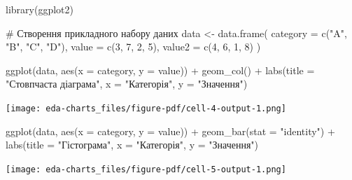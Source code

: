 \documentclass[
  letterpaper,
  DIV=11,
  numbers=noendperiod]{scrreprt}
\newenvironment{Shaded}{\begin{snugshade}}{\end{snugshade}}
\newcommand{\AttributeTok}[1]{\textcolor[rgb]{0.40,0.45,0.13}{#1}}
\newcommand{\CommentTok}[1]{\textcolor[rgb]{0.37,0.37,0.37}{#1}}
\newcommand{\DecValTok}[1]{\textcolor[rgb]{0.68,0.00,0.00}{#1}}
\newcommand{\FunctionTok}[1]{\textcolor[rgb]{0.28,0.35,0.67}{#1}}
\newcommand{\NormalTok}[1]{\textcolor[rgb]{0.00,0.23,0.31}{#1}}
\newcommand{\OtherTok}[1]{\textcolor[rgb]{0.00,0.23,0.31}{#1}}
\newcommand{\SpecialCharTok}[1]{\textcolor[rgb]{0.37,0.37,0.37}{#1}}
\newcommand{\StringTok}[1]{\textcolor[rgb]{0.13,0.47,0.30}{#1}}
\begin{document}
\begin{Shaded}
\begin{Highlighting}[]
\FunctionTok{library}\NormalTok{(ggplot2)}

\CommentTok{\# Створення прикладного набору даних}
\NormalTok{data }\OtherTok{\textless{}{-}} \FunctionTok{data.frame}\NormalTok{(}
  \AttributeTok{category =} \FunctionTok{c}\NormalTok{(}\StringTok{"A"}\NormalTok{, }\StringTok{"B"}\NormalTok{, }\StringTok{"C"}\NormalTok{, }\StringTok{"D"}\NormalTok{),}
  \AttributeTok{value =} \FunctionTok{c}\NormalTok{(}\DecValTok{3}\NormalTok{, }\DecValTok{7}\NormalTok{, }\DecValTok{2}\NormalTok{, }\DecValTok{5}\NormalTok{),}
  \AttributeTok{value2 =} \FunctionTok{c}\NormalTok{(}\DecValTok{4}\NormalTok{, }\DecValTok{6}\NormalTok{, }\DecValTok{1}\NormalTok{, }\DecValTok{8}\NormalTok{)}
\NormalTok{)}
\end{Highlighting}
\end{Shaded}

\begin{Shaded}
\begin{Highlighting}[]
\FunctionTok{ggplot}\NormalTok{(data, }\FunctionTok{aes}\NormalTok{(}\AttributeTok{x =}\NormalTok{ category, }\AttributeTok{y =}\NormalTok{ value)) }\SpecialCharTok{+}
  \FunctionTok{geom\_col}\NormalTok{() }\SpecialCharTok{+}
  \FunctionTok{labs}\NormalTok{(}\AttributeTok{title =} \StringTok{"Стовпчаста діаграма"}\NormalTok{, }\AttributeTok{x =} \StringTok{"Категорія"}\NormalTok{, }\AttributeTok{y =} \StringTok{"Значення"}\NormalTok{)}
\end{Highlighting}
\end{Shaded}

\texttt{[image: eda-charts\_files/figure-pdf/cell-4-output-1.png]}

\begin{Shaded}
\begin{Highlighting}[]
\FunctionTok{ggplot}\NormalTok{(data, }\FunctionTok{aes}\NormalTok{(}\AttributeTok{x =}\NormalTok{ category, }\AttributeTok{y =}\NormalTok{ value)) }\SpecialCharTok{+}
  \FunctionTok{geom\_bar}\NormalTok{(}\AttributeTok{stat =} \StringTok{"identity"}\NormalTok{) }\SpecialCharTok{+}
  \FunctionTok{labs}\NormalTok{(}\AttributeTok{title =} \StringTok{"Гістограма"}\NormalTok{, }\AttributeTok{x =} \StringTok{"Категорія"}\NormalTok{, }\AttributeTok{y =} \StringTok{"Значення"}\NormalTok{)}
\end{Highlighting}
\end{Shaded}

\texttt{[image: eda-charts\_files/figure-pdf/cell-5-output-1.png]}
\end{document}

